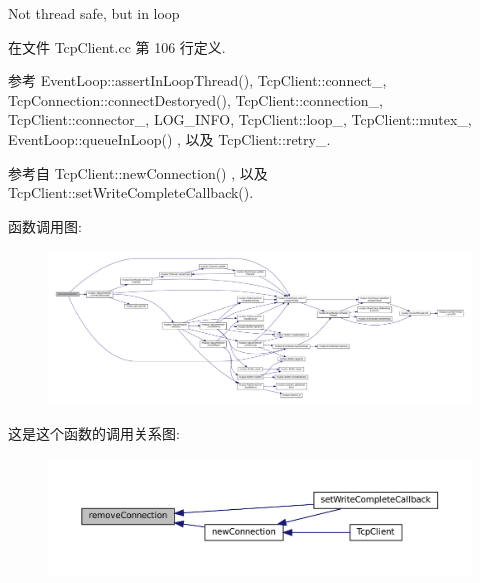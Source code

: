 Not thread safe, but in loop 



在文件 Tcp\+Client.\+cc 第 106 行定义.



参考 Event\+Loop\+::assert\+In\+Loop\+Thread(), Tcp\+Client\+::connect\+\_\+, Tcp\+Connection\+::connect\+Destoryed(), Tcp\+Client\+::connection\+\_\+, Tcp\+Client\+::connector\+\_\+, L\+O\+G\+\_\+\+I\+N\+FO, Tcp\+Client\+::loop\+\_\+, Tcp\+Client\+::mutex\+\_\+, Event\+Loop\+::queue\+In\+Loop() , 以及 Tcp\+Client\+::retry\+\_\+.



参考自 Tcp\+Client\+::new\+Connection() , 以及 Tcp\+Client\+::set\+Write\+Complete\+Callback().

函数调用图\+:
\nopagebreak
\begin{figure}[H]
\begin{center}
\leavevmode
\includegraphics[width=350pt]{classmuduo_1_1TcpClient_ad9661c3f05443256c9439f812d1a7691_cgraph}
\end{center}
\end{figure}
这是这个函数的调用关系图\+:
\nopagebreak
\begin{figure}[H]
\begin{center}
\leavevmode
\includegraphics[width=350pt]{classmuduo_1_1TcpClient_ad9661c3f05443256c9439f812d1a7691_icgraph}
\end{center}
\end{figure}
\mbox{\label{classmuduo_1_1TcpClient_aed2da3d81e2ab3b35cce19615d9434a7}} 
